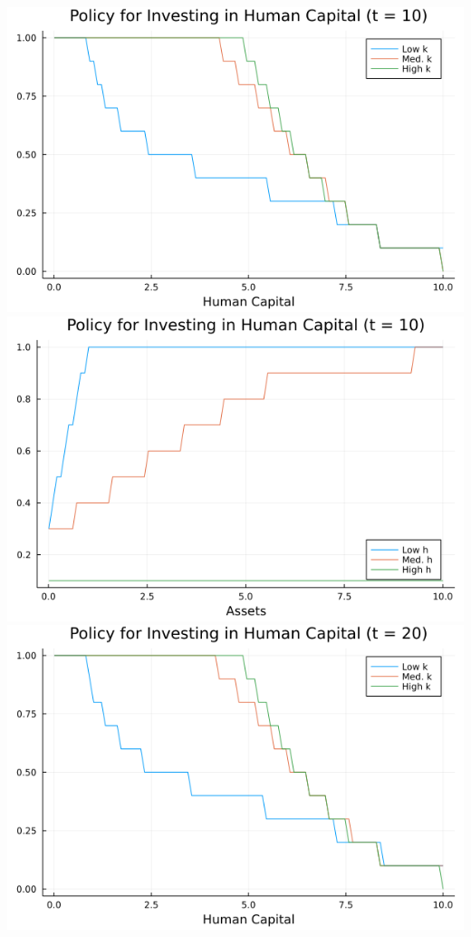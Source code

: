 \documentclass{article}
\begin{document}
\begin{enumerate}
\begin{center}
\includegraphics[scale = 0.5]{figure_3_10_pf_h}
\includegraphics[scale = 0.5]{figure_3_10_pf_k}
\includegraphics[scale = 0.5]{figure_3_20_pf_h}

\end{center}
\end{enumerate}
\end{document}
